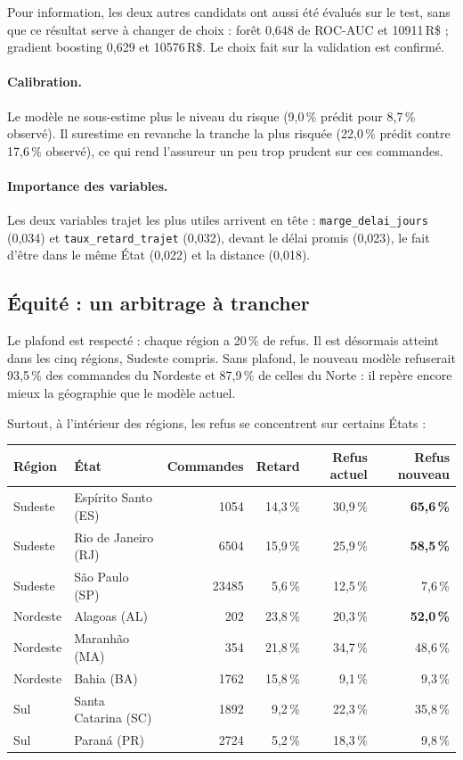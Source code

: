 \documentclass[11pt,a4paper]{article}
\newcommand{\RS}{\,R\$}
\newcommand{\var}[1]{\texttt{#1}}
\begin{document}
Pour information, les deux autres candidats ont aussi été évalués sur le test, sans que ce
résultat serve à changer de choix : forêt 0,648 de ROC-AUC et \num{10911}\RS{} ; gradient boosting
0,629 et \num{10576}\RS{}. Le choix fait sur la validation est confirmé.

\paragraph{Calibration.} Le modèle ne sous-estime plus le niveau du risque (9,0\,\% prédit pour
8,7\,\% observé). Il surestime en revanche la tranche la plus risquée (22,0\,\% prédit contre
17,6\,\% observé), ce qui rend l'assureur un peu trop prudent sur ces commandes.

\paragraph{Importance des variables.} Les deux variables trajet les plus utiles arrivent en
tête : \var{marge\_delai\_jours} (0,034) et \var{taux\_retard\_trajet} (0,032), devant le délai
promis (0,023), le fait d'être dans le même État (0,022) et la distance (0,018).

\subsection{Équité : un arbitrage à trancher}

Le plafond est respecté : chaque région a 20\,\% de refus. Il est désormais atteint dans les
cinq régions, Sudeste compris. Sans plafond, le nouveau modèle refuserait 93,5\,\% des commandes
du Nordeste et 87,9\,\% de celles du Norte : il repère encore mieux la géographie que le modèle
actuel.

Surtout, à l'intérieur des régions, les refus se concentrent sur certains États :

\begin{center}
\begin{tabular}{@{}llrrrr@{}}
\toprule
Région & État & Commandes & Retard & Refus actuel & Refus nouveau \\
\midrule
Sudeste & Espírito Santo (ES) & \num{1054} & 14,3\,\% & 30,9\,\% & \textcolor{sinistre}{\textbf{65,6\,\%}} \\
Sudeste & Rio de Janeiro (RJ) & \num{6504} & 15,9\,\% & 25,9\,\% & \textcolor{sinistre}{\textbf{58,5\,\%}} \\
Sudeste & São Paulo (SP) & \num{23485} & 5,6\,\% & 12,5\,\% & 7,6\,\% \\
Nordeste & Alagoas (AL) & 202 & 23,8\,\% & 20,3\,\% & \textcolor{sinistre}{\textbf{52,0\,\%}} \\
Nordeste & Maranhão (MA) & 354 & 21,8\,\% & 34,7\,\% & 48,6\,\% \\
Nordeste & Bahia (BA) & \num{1762} & 15,8\,\% & 9,1\,\% & 9,3\,\% \\
Sul & Santa Catarina (SC) & \num{1892} & 9,2\,\% & 22,3\,\% & 35,8\,\% \\
Sul & Paraná (PR) & \num{2724} & 5,2\,\% & 18,3\,\% & 9,8\,\% \\
\bottomrule
\end{tabular}
\end{center}
\end{document}
